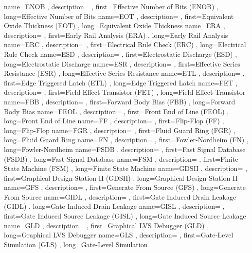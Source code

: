 { name={ENOB}
, description={}
, first={Effective Number of Bits (ENOB)}
, long={Effective Number of Bits}
}
{ name={EOT}
, description={}
, first={Equivalent Oxide Thickness (EOT)}
, long={Equivalent Oxide Thickness}
}
{ name={ERA}
, description={}
, first={Early Rail Analysis (ERA)}
, long={Early Rail Analysis}
}
{ name={ERC}
, description={}
, first={Electrical Rule Check (ERC)}
, long={Electrical Rule Check}
}
{ name={ESD}
, description={}
, first={Electrostatic Discharge (ESD)}
, long={Electrostatic Discharge}
}
{ name={ESR}
, description={}
, first={Effective Series Resistance (ESR)}
, long={Effective Series Resistance}
}
{ name={ETL}
, description={}
, first={Edge Triggered Latch (ETL)}
, long={Edge Triggered Latch}
}
{ name={FET}
, description={}
, first={Field-Effect Transistor (FET)}
, long={Field-Effect Transistor}
}
{ name={FBB}
, description={}
, first={Forward Body Bias (FBB)}
, long={Forward Body Bias}
}
{ name={FEOL}
, description={}
, first={Front End of Line (FEOL)}
, long={Front End of Line}
}
{ name={FF}
, description={}
, first={Flip-Flop (FF)}
, long={Flip-Flop}
}
{ name={FGR}
, description={}
, first={Fluid Guard Ring (FGR)}
, long={Fluid Guard Ring}
}
{ name={FN}
, description={}
, first={Fowler-Nordheim (FN)}
, long={Fowler-Nordheim}
}
{ name={FSDB}
, description={}
, first={Fast Signal Database (FSDB)}
, long={Fast Signal Database}
}
{ name={FSM}
, description={}
, first={Finite State Machine (FSM)}
, long={Finite State Machine}
}
{ name={GDSII}
, description={}
, first={Graphical Design Station II (GDSII)}
, long={Graphical Design Station II}
}
{ name={GFS}
, description={}
, first={Generate From Source (GFS)}
, long={Generate From Source}
}
{ name={GIDL}
, description={}
, first={Gate Induced Drain Leakage (GIDL)}
, long={Gate Induced Drain Leakage}
}
{ name={GISL}
, description={}
, first={Gate Induced Source Leakage (GISL)}
, long={Gate Induced Source Leakage}
}
{ name={GLD}
, description={}
, first={Graphical LVS Debugger (GLD)}
, long={Graphical LVS Debugger}
}
{ name={GLS}
, description={}
, first={Gate-Level Simulation (GLS)}
, long={Gate-Level Simulation}
}
